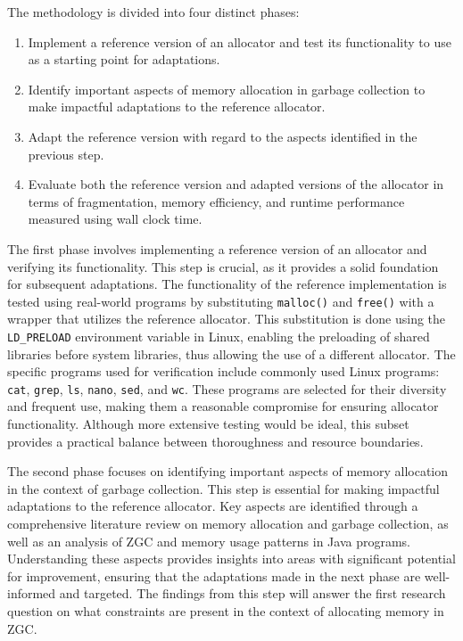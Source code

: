
The methodology is divided into four distinct phases:

\begin{enumerate}
    \item Implement a reference version of an allocator and test its functionality to use as a starting point for adaptations.
    \item Identify important aspects of memory allocation in garbage collection to make impactful adaptations to the reference allocator.
    \item Adapt the reference version with regard to the aspects identified in the previous step.
    \item Evaluate both the reference version and adapted versions of the allocator in terms of fragmentation, memory efficiency, and runtime performance measured using wall clock time.
\end{enumerate}

The first phase involves implementing a reference version of an allocator and verifying its functionality. This step is crucial, as it provides a solid foundation for subsequent adaptations. The functionality of the reference implementation is tested using real-world programs by substituting \texttt{malloc()} and \texttt{free()} with a wrapper that utilizes the reference allocator. This substitution is done using the \texttt{LD\_PRELOAD} environment variable in Linux, enabling the preloading of shared libraries before system libraries, thus allowing the use of a different allocator. The specific programs used for verification include commonly used Linux programs: \texttt{cat}, \texttt{grep}, \texttt{ls}, \texttt{nano}, \texttt{sed}, and \texttt{wc}. These programs are selected for their diversity and frequent use, making them a reasonable compromise for ensuring allocator functionality. Although more extensive testing would be ideal, this subset provides a practical balance between thoroughness and resource boundaries.

The second phase focuses on identifying important aspects of memory allocation in the context of garbage collection. This step is essential for making impactful adaptations to the reference allocator. Key aspects are identified through a comprehensive literature review on memory allocation and garbage collection, as well as an analysis of ZGC and memory usage patterns in Java programs. Understanding these aspects provides insights into areas with significant potential for improvement, ensuring that the adaptations made in the next phase are well-informed and targeted. The findings from this step will answer the first research question on what constraints are present in the context of allocating memory in ZGC.

